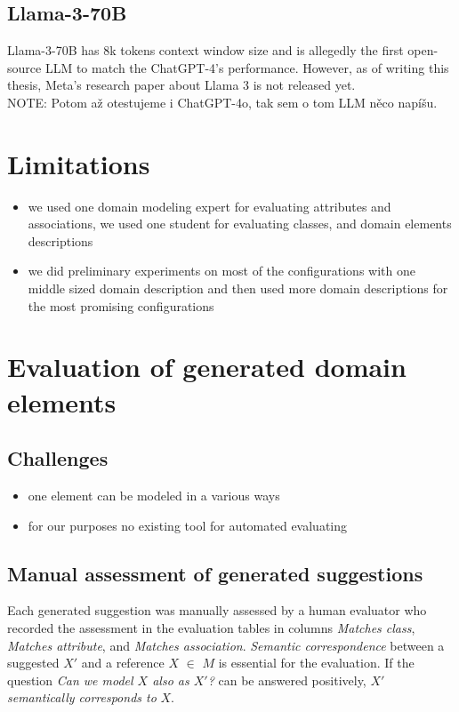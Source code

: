 \subsection{Llama-3-70B}
Llama-3-70B has 8k tokens context window size and is allegedly  the first open-source LLM to match the ChatGPT-4's performance. However, as of writing this thesis, Meta's research paper about Llama 3 is not released yet. \\

NOTE: Potom až otestujeme i ChatGPT-4o, tak sem o tom LLM něco napíšu.

\section{Limitations}
\begin{itemize}
\item we used one domain modeling expert for evaluating attributes and associations, we used one student for evaluating classes, and domain elements descriptions
\item we did preliminary experiments on most of the configurations with one middle sized domain description and then used more domain descriptions for the most promising configurations
\end{itemize}


\section{Evaluation of generated domain elements}

\subsection{Challenges}
\begin{itemize}
\item one element can be modeled in a various ways
\item for our purposes no existing tool for automated evaluating
\end{itemize}


\subsection{Manual assessment of generated suggestions}

Each generated suggestion was manually assessed by a human evaluator who recorded the assessment in the evaluation tables in columns \emph{Matches class}, \emph{Matches attribute}, and \emph{Matches association}.
\emph{Semantic correspondence} between a suggested $X'$ and a reference $X$ $\in$ $M$ is essential for the evaluation.
If the question \emph{Can we model $X$ also as $X'$?} can be answered positively, $X'$ \emph{semantically corresponds to} $X$.

